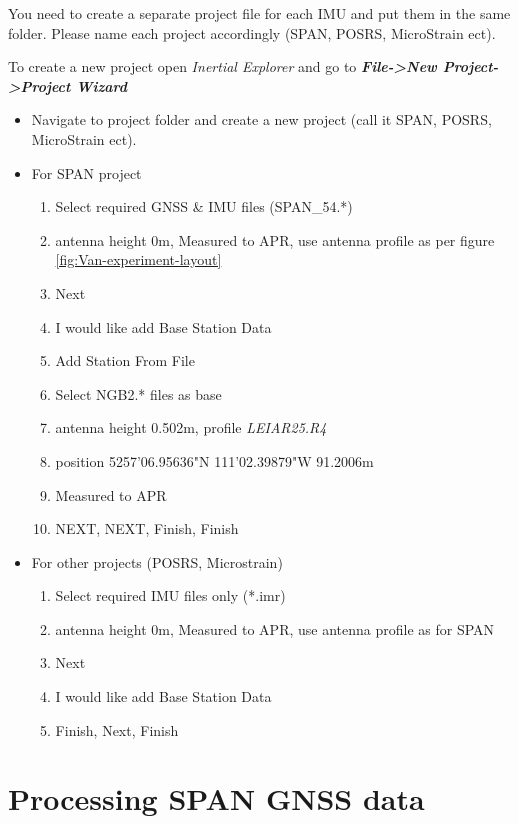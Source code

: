 \documentclass[british]{book}
\begin{document}
You need to create a separate project file for each IMU and put them in the same folder. Please name each project accordingly (SPAN, POSRS, MicroStrain ect).\\
\bigskip

To create a new project open \emph{Inertial Explorer }and go to\textbf{\emph{ File->New Project->Project Wizard}}
\begin{itemize}
	\item Navigate to project folder and create a new project (call it SPAN, POSRS, MicroStrain ect). 
	\item For SPAN project
	\begin{enumerate}
		\item Select required GNSS \& IMU files (SPAN\_54.{*})
		\item antenna height 0m, Measured to APR, use antenna profile as per figure \ref{fig:Van-experiment-layout}
		\item Next
		\item I would like add Base Station Data
		\item Add Station From File
		\item Select NGB2.{*} files as base 
		\item antenna height 0.502m, profile \emph{LEIAR25.R4}
		\item position 52\textdegree{}57'06.95636"N 1\textdegree{}11'02.39879"W 91.2006m
		\item Measured to APR
		\item NEXT, NEXT, Finish, Finish
	\end{enumerate}
	\item For other projects (POSRS, Microstrain)
		\begin{enumerate}
			\item Select required IMU files only ({*}.imr)
			\item antenna height 0m, Measured to APR, use antenna profile as for SPAN
			\item Next
			\item I would like add Base Station Data
			\item Finish, Next, Finish
		\end{enumerate}
\end{itemize}

\section{Processing SPAN GNSS data}\label{sec:Processing-GNSS-data}
\end{document}
